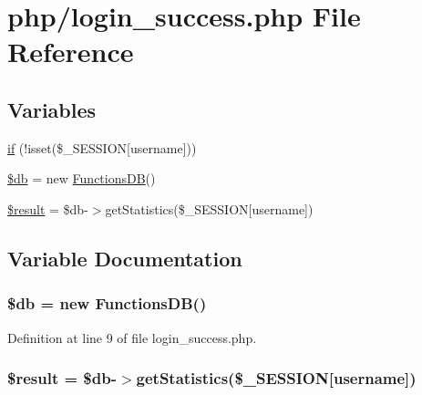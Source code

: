 \hypertarget{php_2login__success_8php}{}\section{php/login\+\_\+success.php File Reference}
\label{php_2login__success_8php}
\subsection*{Variables}
\begin{DoxyCompactItemize}
\item 
\hyperlink{php_2login__success_8php_a417be69c2182c77301b6d9d54792e7e5}{if} (!isset(\$\+\_\+\+S\+E\+S\+S\+I\+O\+N\mbox{[}\textquotesingle{}username\textquotesingle{}\mbox{]}))
\item 
\hyperlink{php_2login__success_8php_a1fa3127fc82f96b1436d871ef02be319}{\$db} = new \hyperlink{class_functions_d_b}{Functions\+D\+B}()
\item 
\hyperlink{php_2login__success_8php_a112ef069ddc0454086e3d1e6d8d55d07}{\$result} = \$db-\/$>$get\+Statistics(\$\+\_\+\+S\+E\+S\+S\+I\+O\+N\mbox{[}\textquotesingle{}username\textquotesingle{}\mbox{]})
\end{DoxyCompactItemize}


\subsection{Variable Documentation}
\hypertarget{php_2login__success_8php_a1fa3127fc82f96b1436d871ef02be319}{}
\subsubsection[{\$db}]{\setlength{\rightskip}{0pt plus 5cm}\$db = new {\bf Functions\+D\+B}()}\label{php_2login__success_8php_a1fa3127fc82f96b1436d871ef02be319}


Definition at line 9 of file login\+\_\+success.\+php.

\hypertarget{php_2login__success_8php_a112ef069ddc0454086e3d1e6d8d55d07}{}
\subsubsection[{\$result}]{\setlength{\rightskip}{0pt plus 5cm}\$result = \$db-\/$>$get\+Statistics(\$\+\_\+\+S\+E\+S\+S\+I\+O\+N\mbox{[}\textquotesingle{}username\textquotesingle{}\mbox{]})}\label{php_2login__success_8php_a112ef069ddc0454086e3d1e6d8d55d07}


